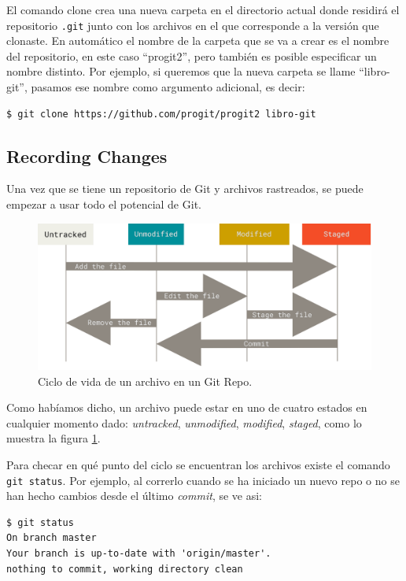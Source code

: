\documentclass[spanish, 12pt, a4paper]{article}
\begin{document}
El comando clone crea una nueva carpeta en el directorio actual donde
residirá el repositorio \texttt{.git} junto con los archivos en el que
corresponde a la versión que clonaste. En automático el nombre de la
carpeta que se va a crear es el nombre del repositorio, en este caso
``progit2'', pero también es posible especificar un nombre distinto. Por
ejemplo, si queremos que la nueva carpeta se llame ``libro-git'',
pasamos ese nombre como argumento adicional, es decir:

\begin{lstlisting}
$ git clone https://github.com/progit/progit2 libro-git
\end{lstlisting}

\subsection{Recording Changes}

Una vez que se tiene un repositorio de Git y archivos rastreados, se
puede empezar a usar todo el potencial de Git.

\begin{figure}
  \centering
  \includegraphics[width=\textwidth]{figs/lifecycle.png}
  \caption{Ciclo de vida de un archivo en un Git Repo.}
  \label{fig:lifecycle}
\end{figure}

Como habíamos dicho, un archivo puede estar en uno de cuatro estados en cualquier momento dado: \textit{untracked}, \textit{unmodified}, \textit{modified}, \textit{staged}, como lo muestra la figura \ref{fig:lifecycle}.

Para checar en qué punto del ciclo se encuentran los archivos existe el comando \texttt{git status}.
Por ejemplo, al correrlo cuando se ha iniciado un nuevo repo o no se han hecho cambios desde el último \textit{commit}, se ve asi:

\begin{lstlisting}
$ git status
On branch master
Your branch is up-to-date with 'origin/master'.
nothing to commit, working directory clean
\end{lstlisting}
\end{document}
